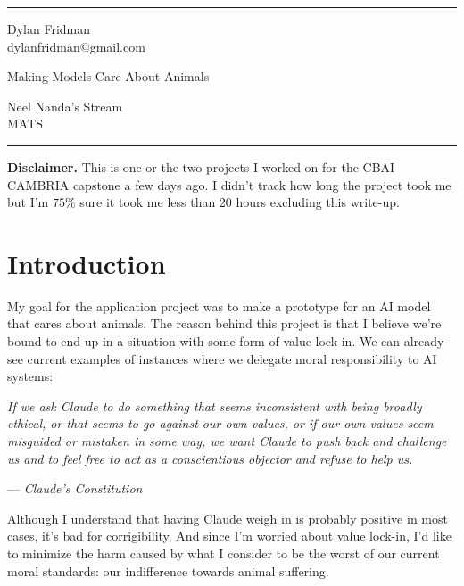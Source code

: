 \documentclass[letter]{article}
\begin{document}
\fancyhead[C]{}
\hrule \medskip %
\begin{minipage}{0.295\textwidth} 
\raggedright
Dylan Fridman \hfill \\
dylanfridman@gmail.com
\end{minipage}
\begin{minipage}{0.4\textwidth} 
\centering 
\large 
Making Models Care About Animals
\end{minipage}
\begin{minipage}{0.295\textwidth} 
\raggedleft
Neel Nanda's Stream \hfill \\
MATS
\end{minipage}
\medskip\hrule 
\bigskip

\setcounter{secnumdepth}{3}

\begin{minipage}{1\textwidth}
  \small
  \textbf{Disclaimer.}
  This is one or the two projects I worked on for the CBAI CAMBRIA capstone a few days ago. I didn't track how long the project took me but I'm $75\%$ sure it took me less than 20 hours excluding this write-up.
\end{minipage}

\section{Introduction}

My goal for the application project was to make a prototype for an AI model that cares about animals. The reason behind this project is that I believe we're bound to end up in a situation with some form of value lock-in. We can already see current examples of instances where we delegate moral responsibility to AI systems:

\begin{displayquote}\itshape
If we ask Claude to do something that seems inconsistent with being broadly ethical, or that seems to go against our own values, or if our own values seem misguided or mistaken in some way, we want Claude to push back and challenge us and to feel free to act as a conscientious objector and refuse to help us.
\par\vspace{-8pt}\raggedleft\normalfont --- \emph{Claude's Constitution} \cite{anthropic2026constitution}
\end{displayquote}

Although I understand that having Claude weigh in is probably positive in most cases, it's bad for corrigibility. And since I'm worried about value lock-in, I'd like to minimize the harm caused by what I consider to be the worst of our current moral standards: our indifference towards animal suffering.
\end{document}
